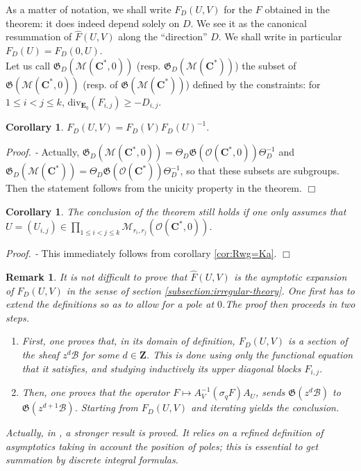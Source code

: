 \documentclass[english]{smfart}
\newtheorem{cor}[thm]{Corollary}
\newtheorem{rmk}[thm]{Remark}
\numberwithin{equation}{thm}
\def \Pr {\textsl{Proof. - }}
\def\sq{\sigma_q}
\def\C{{\mathbf C}}
\def\Z{{\mathbf Z}}
\def\B{{\mathcal{B}}}
\def\M{{\mathcal{M}}}
\def\Eq{{\mathbf{E}_{q}}}
\def\G{{\mathfrak{G}}}
\def\Rw{{\mathcal{O}(\C^{*})}}
\def\Kw{{\mathcal{M}(\C^{*})}}
\def\Rwg{{\mathcal{O}(\C^{*},0)}}
\def\Kwg{{\mathcal{M}(\C^{*},0)}}
\def\l{\left}
\def\r{\right}
\def\Th{\Theta}
\def\div{\text{div}}
\begin{document}
As a matter of notation, we shall write $F_{D}(U,V)$ for the $F$
obtained in the theorem: it does indeed depend solely on $D$. We
see it as the canonical resummation of $\hat{F}(U,V)$ along the
``direction'' $D$. We shall write in particular $F_{D}(U) = F_{D}(0,U)$. \\

Let us call $\G_{D}(\Kwg)$ (resp. $\G_{D}(\Kw)$) the subset of
$\G(\Kwg)$ (resp. of $\G(\Kw)$) defined by the constraints:
for $1 \leq i < j \leq k$, $\div_{\Eq}(F_{i,j}) \geq - D_{i,j}$.

\begin{cor}
$F_{D}(U,V) = F_{D}(V) F_{D}(U)^{-1}$.
\end{cor}

\Pr
Actually, $\G_{D}(\Kwg) = \Th_{D} \G(\Rwg) \Th_{D}^{-1}$ and
$\G_{D}(\Kw) = \Th_{D} \G(\Rw) \Th_{D}^{-1}$, so that these subsets
are subgroups. Then the statement follows from the unicity
property in the theorem.
\hfill $\Box$

\begin{cor}
The conclusion of the theorem still holds if one only assumes that
$U = (U_{i,j}) \in 
\underset{1 \leq i < j \leq k}{\prod} \M_{r_{i},r_{j}}(\Rwg)$.
\end{cor}

\Pr
This immediately follows from corollary \ref{cor:Rwg=Ka}.
\hfill $\Box$

\begin{rmk}
It is not difficult to prove that $\hat{F}(U,V)$ is the aymptotic
expansion of $F_{D}(U,V)$ in the sense of section
\ref{subsection:irregular-theory}. One first has to extend 
the definitions so as to allow for a pole at $0$.The proof then
proceeds in two steps.
\begin{enumerate}
\item{First, one proves that, in its domain of definition,
$F_{D}(U,V)$ is a section of the sheaf $z^{d} \B$ for some
$d \in \Z$. This is done using only the functional equation
that it satisfies, and studying inductively its upper diagonal
blocks $F_{i,j}$.}
\item{Then, one proves that the operator 
$F \mapsto A_{V}^{-1} \l(\sq F\r) A_{U}$, 
sends $\G(z^{d} \B)$ to $\G(z^{d+1} \B)$.
Starting from $F_{D}(U,V)$ and iterating yields the conclusion.}
\end{enumerate}
Actually, in \cite{RSZ}, a stronger result is proved. It relies 
on a refined definition of asymptotics taking in account the position 
of poles; this is essential to get summation by discrete integral
formulas.
\end{rmk}
\end{document}
